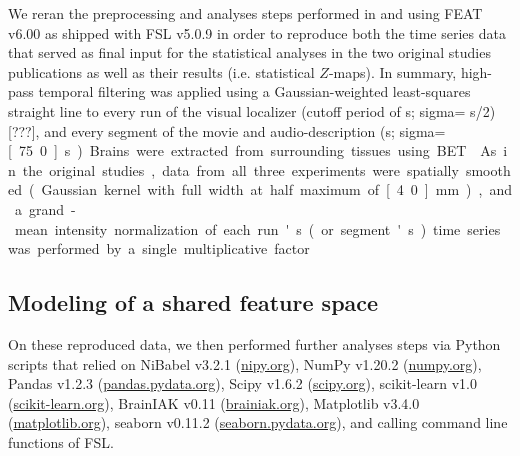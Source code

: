 %
We reran the preprocessing and analyses steps performed in
\citet{sengupta2016extension} and \citet{haeusler2022processing} using FEAT
v6.00 \citep[FMRI Expert Analysis Tool;][]{woolrich2001autocorr} as shipped with
FSL v5.0.9 \citep[\href{https://www.fmrib.ox.ac.uk/fsl}{FMRIB's Software
Library;}][]{smith2004fsl} in order to reproduce both the time series data that
served as final input for the statistical analyses in the two original studies
publications as well as their results (i.e. statistical $Z$-maps).
In summary, high-pass temporal filtering was applied using a Gaussian-weighted
least-squares straight line to every run of the visual localizer (cutoff period
of \unit[100]{s}; sigma= \unit[100]{s}/2)[???], and every segment of the movie
and audio-description (\unit[150]{s}; sigma=\unit[75.0]{s}).
Brains were extracted from surrounding tissues using BET \citep{smith2002bet}.
As in the original studies, data from all three experiments were spatially
smoothed (Gaussian kernel with full width at half maximum of \unit[4.0]{mm}),
and a grand-mean intensity normalization of each run's (or segment's) time
series was performed by a single multiplicative factor.



\subsection{Modeling of a shared feature space}

On these reproduced data, we then performed further analyses steps via
Python scripts that relied on
%
NiBabel v3.2.1 (\href{https://nipy.org}{\url{nipy.org}}),
%
NumPy v1.20.2 (\href{https://numpy.org}{\url{numpy.org}}),
%
Pandas v1.2.3 (\href{https://pandas.pydata.org}{\url{pandas.pydata.org}}),
%
Scipy v1.6.2 (\href{https://scipy.org}{\url{scipy.org}}),
%
scikit-learn v1.0 (\href{https://scikit-learn.org}{\url{scikit-learn.org}}),
%
BrainIAK v0.11 (\href{https://brainiak.org}{\url{brainiak.org}}),
%
Matplotlib v3.4.0 (\href{https://matplotlib.org}{\url{matplotlib.org}}),
%
seaborn v0.11.2 (\href{https://seaborn.pydata.org}{\url{seaborn.pydata.org}}),
%
and calling command line functions of FSL.


